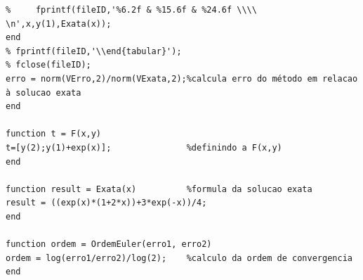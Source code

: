 \documentclass[10pt,a4paper]{article}
\begin{document}
\begin{verbatim}
%     fprintf(fileID,'%6.2f & %15.6f & %24.6f \\\\ \n',x,y(1),Exata(x));
end
% fprintf(fileID,'\\end{tabular}');
% fclose(fileID);
erro = norm(VErro,2)/norm(VExata,2);%calcula erro do método em relacao à solucao exata
end

function t = F(x,y)
t=[y(2);y(1)+exp(x)];               %definindo a F(x,y)
end

function result = Exata(x)          %formula da solucao exata
result = ((exp(x)*(1+2*x))+3*exp(-x))/4;
end

function ordem = OrdemEuler(erro1, erro2)
ordem = log(erro1/erro2)/log(2);    %calculo da ordem de convergencia
end
\end{verbatim} \color{black}
\end{document}
